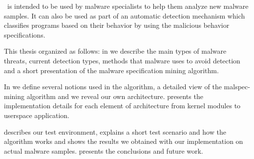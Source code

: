 \project\ is intended to be used by malware specialists to help them analyze new malware samples. It can also be used as part of an automatic detection mechanism which classifies programs based on their behavior by using the malicious behavior specifications.

This thesis organized as follows: in  we describe the main types of malware threats, current detection types, methods that malware uses to avoid detection and a short presentation of the malware specification mining algorithm.

In  we define several notions used in the algorithm, a detailed view of the malspec-mining algorithm and we reveal our own architecture.  presents the implementation details for each element of architecture from kernel modules to userspace application.

 describes our test environment, explains a short test scenario and how the algorithm works and shows the results we obtained with our implementation on actual malware samples.  presents the conclusions and future work.